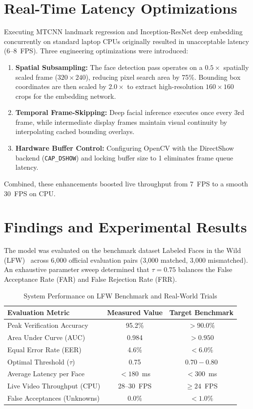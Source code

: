 \documentclass[conference]{IEEEtran}
\begin{document}
\section{Real-Time Latency Optimizations}
Executing MTCNN landmark regression and Inception-ResNet deep embedding concurrently on standard laptop CPUs originally resulted in unacceptable latency (6--8~FPS). Three engineering optimizations were introduced:
\begin{enumerate}
    \item \textbf{Spatial Subsampling:} The face detection pass operates on a $0.5\times$ spatially scaled frame ($320\times 240$), reducing pixel search area by 75\%. Bounding box coordinates are then scaled by $2.0\times$ to extract high-resolution $160\times 160$ crops for the embedding network.
    \item \textbf{Temporal Frame-Skipping:} Deep facial inference executes once every 3rd frame, while intermediate display frames maintain visual continuity by interpolating cached bounding overlays.
    \item \textbf{Hardware Buffer Control:} Configuring OpenCV with the DirectShow backend (\texttt{CAP\_DSHOW}) and locking buffer size to 1 eliminates frame queue latency.
\end{enumerate}

Combined, these enhancements boosted live throughput from 7~FPS to a smooth 30~FPS on CPU.

\section{Findings and Experimental Results}
The model was evaluated on the benchmark dataset Labeled Faces in the Wild (LFW)~\cite{huang2007labeled} across 6,000 official evaluation pairs (3,000 matched, 3,000 mismatched). An exhaustive parameter sweep determined that $\tau = 0.75$ balances the False Acceptance Rate (FAR) and False Rejection Rate (FRR).

\begin{table}[htbp]
\caption{System Performance on LFW Benchmark and Real-World Trials}
\begin{center}
\begin{tabular}{lcc}
\toprule
\textbf{Evaluation Metric} & \textbf{Measured Value} & \textbf{Target Benchmark} \\
\midrule
Peak Verification Accuracy & 95.2\% & $> 90.0\%$ \\
Area Under Curve (AUC) & 0.984 & $> 0.950$ \\
Equal Error Rate (EER) & 4.6\% & $< 6.0\%$ \\
Optimal Threshold ($\tau$) & 0.75 & $0.70 - 0.80$ \\
Average Latency per Face & $< 180$~ms & $< 300$~ms \\
Live Video Throughput (CPU) & 28--30~FPS & $\ge 24$~FPS \\
False Acceptances (Unknowns) & 0.0\% & $< 1.0\%$ \\
\bottomrule
\end{tabular}
\label{tab:results}
\end{center}
\end{table}
\end{document}
